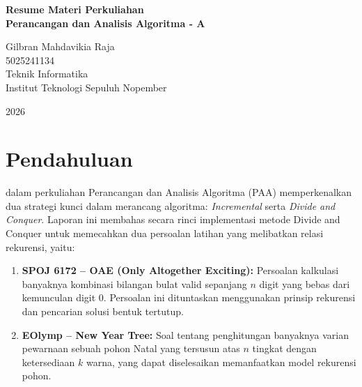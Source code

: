\documentclass[12pt,a4paper]{article}
\theoremstyle{definition}
\begin{document}
\begin{titlepage}
  \centering
  \vspace*{2cm}
  {\LARGE\bfseries Resume Materi Perkuliahan\\[0.4em]
   Perancangan dan Analisis Algoritma - A\par}
  \vspace{2cm}
  {\large Gilbran Mahdavikia Raja\\[0.3em]
   5025241134\\[20em]
   Teknik Informatika\\[0.3em]
   Institut Teknologi Sepuluh Nopember\par}
  \vspace{1cm}
  {\large 2026\par}
  \vfill
\end{titlepage}

\tableofcontents
\newpage

\section{Pendahuluan}

dalam perkuliahan Perancangan dan Analisis Algoritma (PAA) memperkenalkan dua strategi
kunci dalam merancang algoritma: \emph{Incremental} serta \emph{Divide and Conquer}.
Laporan ini membahas secara rinci implementasi metode Divide and Conquer untuk
memecahkan dua persoalan latihan yang melibatkan relasi rekurensi, yaitu:

\begin{enumerate}
  \item \textbf{SPOJ 6172 -- OAE (Only Altogether Exciting):} Persoalan kalkulasi
        banyaknya kombinasi bilangan bulat valid sepanjang $n$ digit yang bebas 
        dari kemunculan digit 0. Persoalan ini dituntaskan menggunakan prinsip 
        rekurensi dan pencarian solusi bentuk tertutup.
  \item \textbf{EOlymp -- New Year Tree:} Soal tentang penghitungan banyaknya 
        varian pewarnaan sebuah pohon Natal yang tersusun atas $n$ tingkat 
        dengan ketersediaan $k$ warna, yang dapat diselesaikan memanfaatkan 
        model rekurensi pohon.
\end{enumerate}
\end{document}
